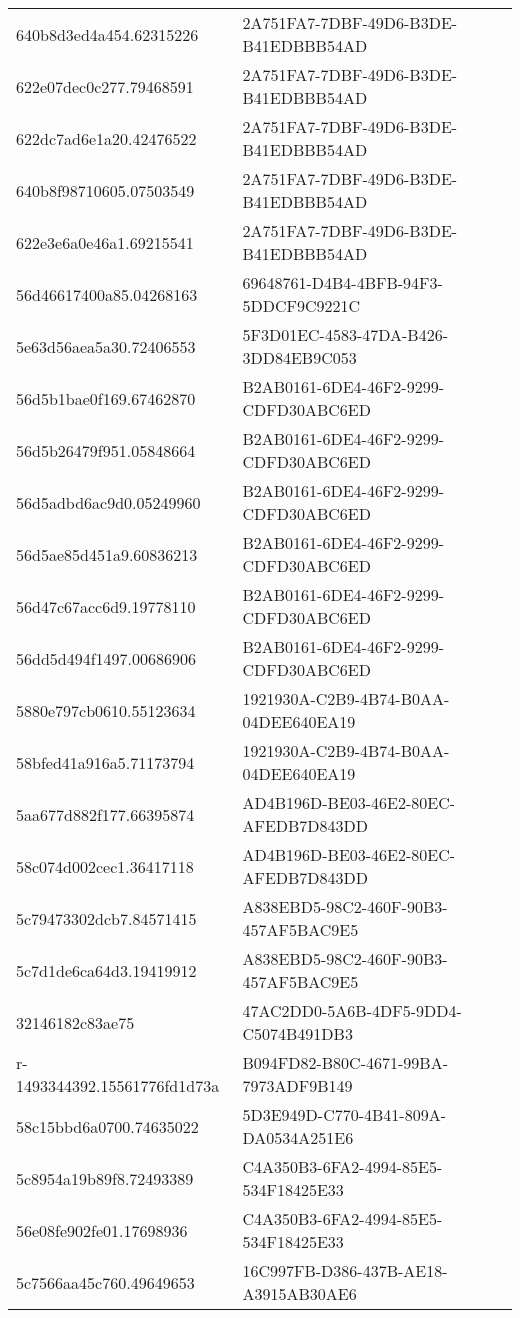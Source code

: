 \begin{tabular}{ll}
640b8d3ed4a454.62315226 & 2A751FA7-7DBF-49D6-B3DE-B41EDBBB54AD \\
622e07dec0c277.79468591 & 2A751FA7-7DBF-49D6-B3DE-B41EDBBB54AD \\
622dc7ad6e1a20.42476522 & 2A751FA7-7DBF-49D6-B3DE-B41EDBBB54AD \\
640b8f98710605.07503549 & 2A751FA7-7DBF-49D6-B3DE-B41EDBBB54AD \\
622e3e6a0e46a1.69215541 & 2A751FA7-7DBF-49D6-B3DE-B41EDBBB54AD \\
56d46617400a85.04268163 & 69648761-D4B4-4BFB-94F3-5DDCF9C9221C \\
5e63d56aea5a30.72406553 & 5F3D01EC-4583-47DA-B426-3DD84EB9C053 \\
56d5b1bae0f169.67462870 & B2AB0161-6DE4-46F2-9299-CDFD30ABC6ED \\
56d5b26479f951.05848664 & B2AB0161-6DE4-46F2-9299-CDFD30ABC6ED \\
56d5adbd6ac9d0.05249960 & B2AB0161-6DE4-46F2-9299-CDFD30ABC6ED \\
56d5ae85d451a9.60836213 & B2AB0161-6DE4-46F2-9299-CDFD30ABC6ED \\
56d47c67acc6d9.19778110 & B2AB0161-6DE4-46F2-9299-CDFD30ABC6ED \\
56dd5d494f1497.00686906 & B2AB0161-6DE4-46F2-9299-CDFD30ABC6ED \\
5880e797cb0610.55123634 & 1921930A-C2B9-4B74-B0AA-04DEE640EA19 \\
58bfed41a916a5.71173794 & 1921930A-C2B9-4B74-B0AA-04DEE640EA19 \\
5aa677d882f177.66395874 & AD4B196D-BE03-46E2-80EC-AFEDB7D843DD \\
58c074d002cec1.36417118 & AD4B196D-BE03-46E2-80EC-AFEDB7D843DD \\
5c79473302dcb7.84571415 & A838EBD5-98C2-460F-90B3-457AF5BAC9E5 \\
5c7d1de6ca64d3.19419912 & A838EBD5-98C2-460F-90B3-457AF5BAC9E5 \\
32146182c83ae75 & 47AC2DD0-5A6B-4DF5-9DD4-C5074B491DB3 \\
r-1493344392.15561776fd1d73a & B094FD82-B80C-4671-99BA-7973ADF9B149 \\
58c15bbd6a0700.74635022 & 5D3E949D-C770-4B41-809A-DA0534A251E6 \\
5c8954a19b89f8.72493389 & C4A350B3-6FA2-4994-85E5-534F18425E33 \\
56e08fe902fe01.17698936 & C4A350B3-6FA2-4994-85E5-534F18425E33 \\
5c7566aa45c760.49649653 & 16C997FB-D386-437B-AE18-A3915AB30AE6 \\

\end{tabular}
